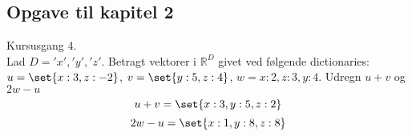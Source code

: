\subsection{Opgave til kapitel 2}
Kursusgang 4.\\
Lad  $D={'x', 'y', 'z'}$. 
Betragt vektorer i  $\mathbb{R}^D$ givet ved følgende dictionaries: $u=\set{x:3,z:-2}$, $v=\set{y:5,z:4}$, $w={x:2,z:3,y:4}$.
Udregn $u+v$ og $2w-u$
\begin{equation}
    u+v=\set{x:3,y:5,z:2}
\end{equation}
\begin{equation}
    2w-u=\set{x:1,y:8,z:8}
\end{equation}
